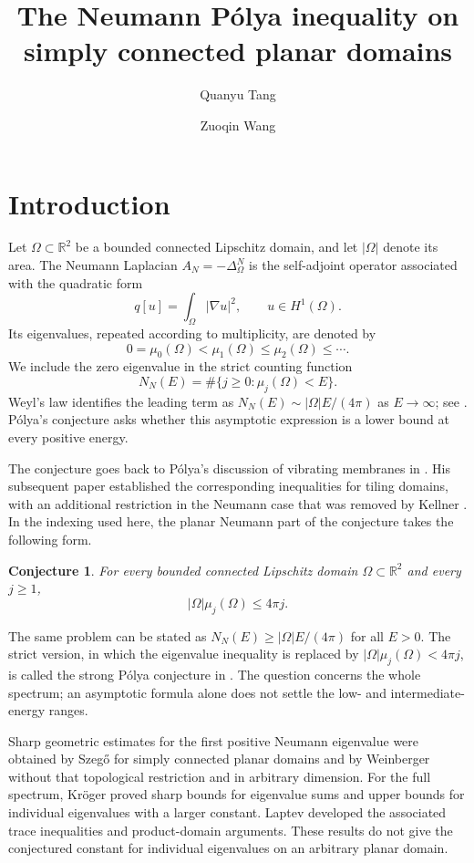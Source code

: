 \documentclass[11pt]{amsart}
\title[The Neumann P\'olya inequality]{The Neumann P\'olya inequality on simply connected planar domains}
\author{Quanyu Tang \and Zuoqin Wang}
\date{}
\numberwithin{equation}{section}
\newtheorem{conjecture}{Conjecture}
\begin{document}
\maketitle

\section{Introduction}\label{sec:intro}

Let $\Omega\subset\mathbb R^2$ be a bounded connected Lipschitz domain,
and let $|\Omega|$ denote its area. The Neumann Laplacian
$A_N=-\Delta_\Omega^N$ is the self-adjoint operator associated with the
quadratic form
\[
 q[u]=\int_\Omega|\nabla u|^2,\qquad u\in H^1(\Omega).
\]
Its eigenvalues, repeated according to multiplicity, are denoted by
\[
 0=\mu_0(\Omega)<\mu_1(\Omega)\le\mu_2(\Omega)\le\cdots.
\]
We include the zero eigenvalue in the strict counting function
\[
 N_N(E)=\#\{j\ge0:\mu_j(\Omega)<E\}.
\]
Weyl's law identifies the leading term as
$N_N(E)\sim |\Omega|E/(4\pi)$ as $E\to\infty$; see
\cite{Weyl,FLPS}. P\'olya's conjecture asks whether this asymptotic
expression is a lower bound at every positive energy.

The conjecture goes back to P\'olya's discussion of vibrating membranes
in \cite{Polya54}. His subsequent paper \cite{Polya} established the
corresponding inequalities for tiling domains, with an additional
restriction in the Neumann case that was removed by Kellner
\cite{Kellner}. In the indexing used here, the planar Neumann part of
the conjecture takes the following form.

\begin{conjecture}\label{conj:polya}
For every bounded connected Lipschitz domain
$\Omega\subset\mathbb R^2$ and every $j\ge1$,
\[
 |\Omega|\mu_j(\Omega)\le4\pi j.
\]
\end{conjecture}

The same problem can be stated as $N_N(E)\ge |\Omega|E/(4\pi)$ for
all $E>0$. The strict version, in which the eigenvalue inequality is
replaced by $|\Omega|\mu_j(\Omega)<4\pi j$, is called the strong
P\'olya conjecture in \cite{FLP}. The question concerns the whole
spectrum; an asymptotic formula alone does not settle the low- and
intermediate-energy ranges.

Sharp geometric estimates for the first positive Neumann eigenvalue
were obtained by Szeg\H{o} \cite{Szego} for simply connected planar
domains and by Weinberger \cite{Weinberger} without that topological
restriction and in arbitrary dimension. For the full spectrum,
Kr\"oger \cite{Kroger} proved sharp bounds for eigenvalue sums and
upper bounds for individual eigenvalues with a larger constant.
Laptev \cite{Laptev} developed the associated trace inequalities and
product-domain arguments. These results do not give the conjectured
constant for individual eigenvalues on an arbitrary planar domain.
\end{document}
